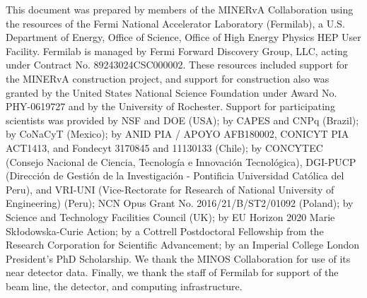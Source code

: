 \documentclass[aps,prl,twocolumn,showpacs,superscriptaddress,letterpaper,showkeys,superscriptaddress,floatfix,nofootinbib]{revtex4-1}
\begin{document}
\begin{acknowledgments}

This document was prepared by members of the MINERvA Collaboration using the resources of the Fermi National Accelerator Laboratory (Fermilab), a U.S. Department of Energy, Office of Science, Office of High Energy Physics HEP User Facility. Fermilab is managed by Fermi Forward Discovery Group, LLC, acting under Contract No. 89243024CSC000002.
These resources included support for the MINERvA construction project, and support
for construction also
was granted by the United States National Science Foundation under
Award No. PHY-0619727 and by the University of Rochester. Support for
participating scientists was provided by NSF and DOE (USA); by CAPES
and CNPq (Brazil); by CoNaCyT (Mexico); by ANID PIA / APOYO AFB180002, CONICYT PIA ACT1413, and Fondecyt 3170845 and 11130133 (Chile); 
by CONCYTEC (Consejo Nacional de Ciencia, Tecnolog\'ia e Innovaci\'on Tecnol\'ogica), DGI-PUCP (Direcci\'on de Gesti\'on de la Investigaci\'on  - Pontificia Universidad Cat\'olica del Peru), and VRI-UNI (Vice-Rectorate for Research of National University of Engineering) (Peru); NCN Opus Grant No. 2016/21/B/ST2/01092 (Poland); by Science and Technology Facilities Council (UK); by EU Horizon 2020 Marie Skłodowska-Curie Action; by a Cottrell Postdoctoral Fellowship from the Research Corporation for Scientific Advancement; by an Imperial College London President's PhD Scholarship.  We thank the MINOS Collaboration for use of its near detector data. Finally, we thank the staff of
Fermilab for support of the beam line, the detector, and computing infrastructure.



%
%
%
%
%
%
%
%
%
%
%
%
\end{acknowledgments}
\end{document}
